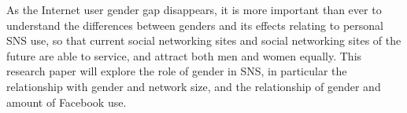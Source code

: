 As the Internet user gender gap disappears, it is more important than ever to understand the differences between genders and its effects relating to personal SNS use, so that current social networking sites and social networking sites of the future are able to service, and attract both men and women equally. This research paper
will explore the role of gender in SNS, in particular the relationship with gender and network size, and the relationship of gender and amount of Facebook use. 




